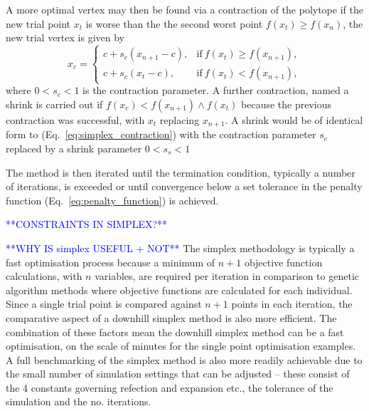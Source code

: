 \documentclass[../main.tex]{subfiles}
\begin{document}
A more optimal vertex may then be found via a contraction of the polytope if the new trial point $x_{t}$ is worse than the the second worst point $f\left(x_{t}\right) \geq f\left(x_{n}\right)$, the new trial vertex is given by
\begin{equation}
x_{c} = 
\begin{cases}
c+s_{c}\left(x_{n+1}-c\right), & \text{if}  ~f\left(x_{t}\right) \geq f\left(x_{n+1}\right), \\
c+s_{c}\left(x_{t}-c\right), & \text{if}  ~f\left(x_{t}\right) < f\left(x_{n+1}\right),
\end{cases}
\label{eq:simplex_contraction}
\end{equation}
where $0 < s_{c} < 1$ is the contraction parameter. A further contraction, named a shrink is carried out if $f\left(x_{c}\right) < f\left(x_{n+1}\right) \land f\left(x_{t}\right)$ because the previous contraction was successful, with $x_{t}$ replacing $x_{n+1}$. A shrink would be of identical form to (Eq.~\ref{eq:simplex_contraction}) with the contraction parameter $s_{c}$ replaced by a shrink parameter $0 < s_{s} < 1$ 

The method is then iterated until the termination condition, typically a number of iterations, is exceeded or until convergence below a set tolerance in the penalty function (Eq.~\ref{eq:penalty_function}) is achieved. 

\textcolor{blue}{**CONSTRAINTS IN SIMPLEX?**}

\textcolor{blue}{**WHY IS simplex USEFUL + NOT**}
The simplex methodology is typically a fast optimisation process because a minimum of $n+1$  objective function calculations, with $n$ variables, are required per iteration in comparison to genetic algorithm methods where objective functions are calculated for each individual. Since a single trial point is compared against $n+1$ points in each iteration, the comparative aspect of a downhill simplex method is also more efficient. The combination of these factors mean the downhill simplex method can be a fast optimisation, on the scale of minutes for the single point optimisation examples. A full benchmarking of the simplex method is also more readily achievable due to the small number of simulation settings that can be adjusted -- these consist of the 4 constants governing refection and expansion etc., the tolerance of the simulation and the no. iterations.   
\end{document}
